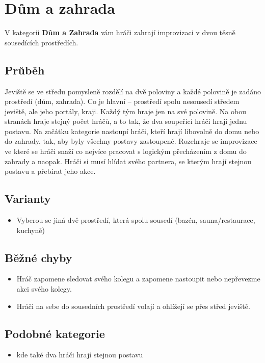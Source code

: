 \documentclass[main.tex]{subfiles}
\begin{document}
\needspace{5cm} \section{Dům a zahrada} \label{dům a zahrada}  
 
 
V kategorii \textbf{Dům a Zahrada}{} vám hráči zahrají improvizaci v dvou těsně sousedících prostředích. 
 
 
\subsection{Průběh} Jeviště se ve středu pomysleně rozdělí na dvě poloviny a každé polovině je zadáno prostředí (dům, zahrada). Co je hlavní – prostředí spolu nesousedí středem jeviště, ale jeho portály, kraji. Každý tým hraje jen na své polovině. Na obou stranách hraje stejný počet hráčů, a to tak, že dva soupeřící hráči hrají jednu postavu. Na začátku kategorie nastoupí hráči, kteří hrají libovolně do domu nebo do zahrady, tak, aby byly všechny postavy zastoupené. Rozehraje se improvizace ve které se hráči snaží co nejvíce pracovat s logickým přecházením z domu do zahrady a naopak. Hráči si musí hlídat svého partnera, se kterým hrají stejnou postavu a přebírat jeho akce. 
 
\subsection{ Varianty } \begin{itemize}
\item Vyberou se jiná dvě prostředí, která spolu sousedí (bazén, sauna/restaurace, kuchyně)
\end{itemize}
 
\subsection{ Běžné chyby } \begin{itemize}
\item Hráč zapomene sledovat svého kolegu a zapomene nastoupit nebo nepřevezme akci svého kolegy.
\item Hráči na sebe do sousedních prostředí volají a ohlížejí se přes střed jeviště.
\end{itemize}
\subsection{Podobné kategorie} \begin{itemize}
\item {} kde také dva hráči hrají stejnou postavu
\end{itemize}
 
\end{document}
